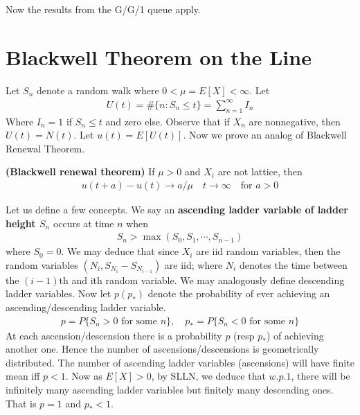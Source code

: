 \documentclass[a4paper,10pt,english]{article}
\begin{document}
Now the results from the G/G/1 queue apply.

\section{Blackwell Theorem on the Line}
Let $S_n$ denote a random walk where $0<\mu=E[X] < \infty$. Let 
\begin{align*}U(t)=\#\{n: S_n \leq t\} = \sum_{n=1}^\infty I_n\end{align*}
Where $I_n=1$ if $S_n \leq t$ and zero else. Observe that if $X_n$ are nonnegative, then $U(t) = N(t)$. Let $u(t) = E[U(t)]$. Now we prove an analog of Blackwell Renewal Theorem. 

\begin{thm}
\textbf{(Blackwell renewal theorem)} If $\mu > 0$ and $X_i$ are not lattice, then
\begin{align*}u(t+a) - u(t) \to a/\mu \quad t\to \infty \quad \mbox{for }a>0\end{align*}
\end{thm}
Let us define a few concepts. We say an \textbf{ascending ladder variable of ladder height $S_n$} occurs at time $n$ when
\begin{align*}S_n > \max(S_0,S_1,\cdots, S_{n-1})\end{align*}
where $S_0 = 0$. We may deduce that since $X_i$ are iid random variables, then the random variables $(N_i,S_{N_i}-S_{N_{i-1}})$ are iid; where $N_i$ denotes the time between the $(i-1)$th and ith random variable. We may analogously define descending ladder variables. Now let $p(p_*)$ denote the probability of ever achieving an ascending/descending ladder variable.
\begin{align*}p = P\{S_n > 0 \mbox{ for some }n\},\quad p_* = P\{S_n < 0 \mbox{ for some }n\}\end{align*}
At each ascension/descension there is a probability $p$ (resp $p_*$) of achieving another one. Hence the number of ascensions/descensions is geometrically distributed. The number of ascending ladder variables (ascensions) will have finite mean iff $p < 1$. Now as $E[X] > 0$, by SLLN, we deduce that $w.p.1$, there will be infinitely many ascending ladder variables but finitely many descending ones. That is $p =1$ and $p_* < 1$.
\end{document}
